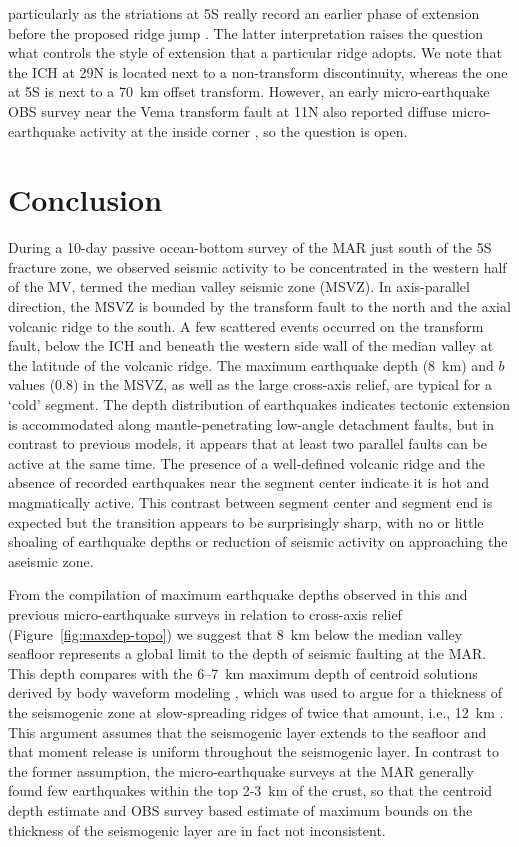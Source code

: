 \documentclass[jgr]{aguplus}
\newlength{\tw}
\begin{document}
\begin{article}
particularly as the striations at 5\dg S really record an earlier
phase of extension before the proposed ridge jump
\citep{reston02}. The latter interpretation  raises  the question what
controls the style of extension that a particular ridge adopts.   We
note that the
ICH at 29\dg N is located next to a non-transform discontinuity,
whereas the one at 5\dg S is next to a 70~km offset transform. However,
an early micro-earthquake OBS survey near the Vema transform fault at
11\dg N also reported diffuse micro-earthquake activity at the inside
corner \citep{rowlett84}, so the question is open.

\section{Conclusion}

During a 10-day passive ocean-bottom survey of the  MAR just south
of the 5\dg S fracture zone, we observed seismic activity to be
concentrated in the western half of the MV, termed the median valley
seismic zone (MSVZ). In axis-parallel direction, the MSVZ is bounded
by the transform fault to the north and the axial
volcanic ridge to the south.  A few scattered events occurred on the transform
fault, below the ICH and beneath the western side wall of the median
valley at the latitude of the volcanic ridge. The maximum earthquake
depth (8~km) and $b$ values (0.8) in the MSVZ, as well as the large
cross-axis relief, are typical for a `cold' segment.  The depth
distribution of earthquakes indicates tectonic extension is
accommodated along mantle-penetrating low-angle detachment faults, but in contrast to
previous models, it appears that at least two parallel faults can be
active at the same time.  The presence of a well-defined volcanic
ridge and the absence of recorded earthquakes near the segment center
indicate it is hot and magmatically active.  This contrast between
segment center and segment end is expected but the transition appears
to be surprisingly sharp, with no or little shoaling of earthquake
depths or reduction of seismic activity on approaching the aseismic
zone.

From the compilation of maximum earthquake depths observed in this and
previous micro-earthquake surveys in relation to cross-axis relief
(Figure~\ref{fig:maxdep-topo}) we suggest that 8~km below the median valley
seafloor represents a global limit to the depth of seismic faulting at
the MAR.  This depth compares with the 6--7~km maximum depth of centroid
solutions derived by body waveform modeling \citep{huang88}, which was
used to argue for a thickness of the seismogenic zone at
slow-spreading ridges of twice that
amount, i.e., 12~km \citep{solomon88}.  This argument assumes
that the seismogenic layer extends to the seafloor and that moment
release is uniform throughout the seismogenic layer.  In contrast to
the former assumption, the micro-earthquake surveys at the MAR
generally found few earthquakes within the top 2-3~km of the crust, so
that the centroid depth estimate and OBS survey
based estimate of maximum bounds on the thickness of the seismogenic
layer are in fact not inconsistent.


\end{article}
\end{document}
